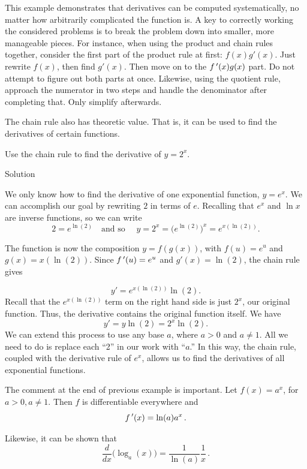 This example demonstrates that derivatives can be computed systematically, no matter how arbitrarily complicated the function is. A key to correctly working the considered problems is to break the problem down into smaller, more manageable pieces. For instance, when using the product and chain rules together, consider the first part of the product rule at first: $f(x)g'(x)$. Just rewrite $f(x)$, then find $g'(x)$. Then move on to the $f\,'(x)g(x)$ part. Do not attempt to figure out both parts at once. Likewise, using the quotient rule, approach the numerator in two steps and handle the denominator after completing that. Only simplify afterwards.

The chain rule also has theoretic value. That is, it can be used to find the derivatives of certain functions.

\begin{example}\label{ex_chain8}
Use the chain rule to find the derivative of $y= 2^x$.

Solution 

We only know how to find the derivative of one exponential function, $y = e^x$. %
 We can accomplish our goal by rewriting $2$ in terms of $e$. Recalling that $e^x$ and $\ln x$ are inverse functions, so we can write
$$2=e^{\ln(2)} \quad \text{and so }\quad y=2^x = \big(e^{\ln(2)}\big)^x = e^{x(\ln(2))}.$$


The function is now the composition $y=f(g(x))$, with $f(u) = e^u$ and $g(x) = x(\ln(2))$.  Since $f\,'(u) = e^u$ and $g'(x) = \ln(2)$, the chain rule  gives 

$$
y' = e^{x (\ln(2))}  \ln(2).
$$
Recall that the $e^{x(\ln(2))}$ term on the right hand side is just $2^x$, our original function. Thus, the derivative contains the original function itself. We have
$$
y' = y  \ln(2) = 2^x \ln(2).
$$
We can extend this process to use any base $a$, where $a>0$ and $a\neq 1$. All we need to do is replace each ``2'' in our work with ``$a$.'' In this way, the chain rule, coupled with the derivative rule of $e^x$, allows us to find the derivatives of all exponential functions.
\end{example}

The comment at the end of previous example is important. Let $f(x)=a^x$, for $a>0, a\neq 1$. Then $f$ is differentiable everywhere and 
$$f\,'(x) = \ln (a) a^x\,.$$

Likewise, it can be shown that 
$$\frac{d}{dx}\big(\log_a (x)\big) = \frac{1}{\ln(a)}\frac{1}{x}\,.$$


